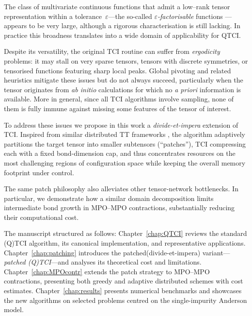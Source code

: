 The class of multivariate continuous functions that admit a low–rank tensor representation within a tolerance~$\varepsilon$—the so-called \emph{$\varepsilon$-factorisable} functions \cite{Fernandez2022}—appears to be
very large, although a rigorous characterisation is still lacking.  In practice this broadness translates into a wide domain of applicability for QTCI.

Despite its versatility, the original TCI routine can suffer from \emph{ergodicity} problems: it may stall on very sparse tensors, tensors with
discrete symmetries, or tensorised functions featuring sharp local peaks. Global pivoting and related heuristics \cite{Fernandez2024} mitigate these issues but do not always succeed, particularly when the tensor originates from \textit{ab initio} calculations for which no \emph{a priori} information is available. More in general, since all TCI algorithms involve sampling, none of them is fully immune against missing some features of the tensor of interest.

To address these issues we propose in this work a \emph{divide-et-impera} extension of TCI. Inspired from similar distributed TT frameworks \cite{Hiroshi2023,Ehrlacher2021}, the algorithm adaptively partitions the target tensor into smaller subtensors (“patches”), TCI compressing each with a fixed bond-dimension cap, and thus concentrates resources on the most challenging regions of configuration space while keeping the overall memory footprint under control. 

The same patch philosophy also alleviates other tensor-network bottlenecks. In particular, we demonstrate how a similar domain decomposition limits intermediate bond growth in MPO–MPO contractions, substantially reducing their computational cost.

The manuscript structured as follows: Chapter~\ref{chap:QTCI} reviews the standard (Q)TCI algorithm, its canonical implementation, and representative applications. Chapter~\ref{chap:patching} introduces the patched(divide-et-impera) variant—\emph{patched (Q)TCI}—and analyses its theoretical cost and limitations. Chapter~\ref{chap:MPOcontr} extends the patch strategy to MPO–MPO contractions, presenting both greedy and adaptive distributed schemes with cost estimates. Chapter~\ref{chap:results} presents numerical benchmarks and showcases the new algorithms on selected problems centred on the single-impurity Anderson model.



